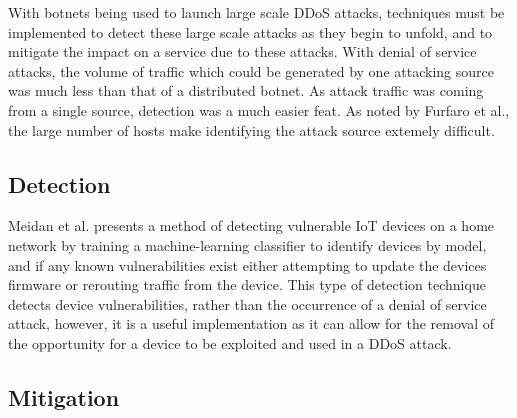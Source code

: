 With botnets being used to launch large scale DDoS attacks, techniques must be
implemented to detect these large scale attacks as they begin to unfold, and to
mitigate the impact on a service due to these attacks. With denial of service
attacks, the volume of traffic which could be generated by one attacking source
was much less than that of a distributed botnet. As attack traffic was coming
from a single source, detection was a much easier feat. As noted by Furfaro et
al.\cite{furfaro}, the large number of hosts make identifying the attack source
extemely difficult.

\subsection{Detection}

Meidan et al.\cite{meidan} presents a method of detecting vulnerable IoT devices on a
home network by training a machine-learning classifier to identify devices by
model, and if any known vulnerabilities exist either attempting to update the
devices firmware or rerouting traffic from the device. This type of detection
technique detects device vulnerabilities, rather than the occurrence of a denial
of service attack, however, it is a useful implementation as it can allow for
the removal of the opportunity for a device to be exploited and used in a DDoS
attack.

\subsection{Mitigation}

